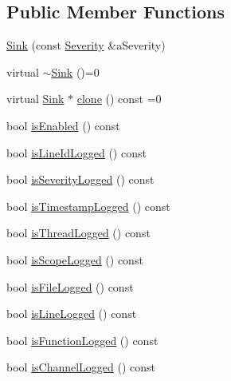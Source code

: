 \subsection*{Public Member Functions}
\begin{DoxyCompactItemize}
\item 
\hyperlink{classlibrary_1_1core_1_1logger_1_1sinks_1_1Sink_a4d53e570fb2be9c97596289743d0ef9d}{Sink} (const \hyperlink{namespacelibrary_1_1core_1_1logger_a35f71353edf64f68f7fe3874b01abaa8}{Severity} \&a\+Severity)
\item 
virtual \hyperlink{classlibrary_1_1core_1_1logger_1_1sinks_1_1Sink_af00134e95d23ea002acd6dfcc8feed7e}{$\sim$\+Sink} ()=0
\item 
virtual \hyperlink{classlibrary_1_1core_1_1logger_1_1sinks_1_1Sink}{Sink} $\ast$ \hyperlink{classlibrary_1_1core_1_1logger_1_1sinks_1_1Sink_a00ba941947d903825f4922694e0961dd}{clone} () const =0
\item 
bool \hyperlink{classlibrary_1_1core_1_1logger_1_1sinks_1_1Sink_a31a8ad92f76ad05d630d50fe63c1b747}{is\+Enabled} () const
\item 
bool \hyperlink{classlibrary_1_1core_1_1logger_1_1sinks_1_1Sink_a5670a0ee01ffa61fce94ff14b744cda4}{is\+Line\+Id\+Logged} () const
\item 
bool \hyperlink{classlibrary_1_1core_1_1logger_1_1sinks_1_1Sink_af6daeb043af9f1997c04d0e24c12900c}{is\+Severity\+Logged} () const
\item 
bool \hyperlink{classlibrary_1_1core_1_1logger_1_1sinks_1_1Sink_ae9a663485069c6716bb3675d67bd6cd6}{is\+Timestamp\+Logged} () const
\item 
bool \hyperlink{classlibrary_1_1core_1_1logger_1_1sinks_1_1Sink_afdf81adfa6c595d8014b466d86479fae}{is\+Thread\+Logged} () const
\item 
bool \hyperlink{classlibrary_1_1core_1_1logger_1_1sinks_1_1Sink_a09eb7bc8611effd50151c5e371a5962c}{is\+Scope\+Logged} () const
\item 
bool \hyperlink{classlibrary_1_1core_1_1logger_1_1sinks_1_1Sink_a736086840b9c964c40e349d5e7f68cca}{is\+File\+Logged} () const
\item 
bool \hyperlink{classlibrary_1_1core_1_1logger_1_1sinks_1_1Sink_a701bbd71bc5f871ac97abdc98fa4460f}{is\+Line\+Logged} () const
\item 
bool \hyperlink{classlibrary_1_1core_1_1logger_1_1sinks_1_1Sink_a39078847a7c0f6a22893dd82e64545f1}{is\+Function\+Logged} () const
\item 
bool \hyperlink{classlibrary_1_1core_1_1logger_1_1sinks_1_1Sink_a708041f4c444c21ea1963bd0649b6ac5}{is\+Channel\+Logged} () const

\end{DoxyCompactItemize}
